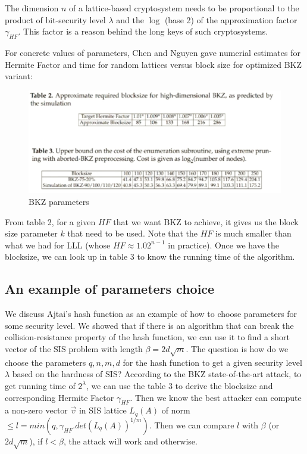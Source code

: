\begin{remark}
  The dimension $n$ of a lattice-based cryptosystem needs to be proportional to
  the product of bit-security level $\lambda$ and the $\log$ (base 2) of the
  approximation factor $\gamma_{HF}$.  This factor is a reason behind the long
  keys of such cryptosystems.
  \label{rem:dimension}
\end{remark}

For concrete values of parameters, Chen and Nguyen \cite{chen2011bkz} gave
numerial estimates for Hermite Factor and time for random lattices versus block
size for optimized BKZ variant:

\begin{figure}[h]
  \centering \includegraphics[scale=0.3]{bkzparams}
  \caption{BKZ parameters}
  \label{fig:BKZParams}
\end{figure}

From table 2, for a given $HF$ that we want BKZ to achieve, it gives us the
block size parameter $k$ that need to be used. Note that the $HF$ is much
smaller than what we had for LLL (whose $HF \approx 1.02^{n-1}$ in
practice). Once we have the blocksize, we can look up in table 3 to know the
running time of the algorithm.

\subsection{An example of parameters choice}
\label{sec:parameterChoice}
We discuss Ajtai's hash function as an example of how to choose parameters for
some security level. We showed that if there is an algorithm that can break the
collision-resistance property of the hash function, we can use it to find a
short vector of the SIS problem with length $\beta = 2d\sqrt{m}$. The question
is how do we choose the parameters $q,n,m,d$ for the hash function to get a
given security level $\lambda$ based on the hardness of SIS? According to the
BKZ state-of-the-art attack, to get running time of $2^\lambda$, we can use the
table 3 to derive the blocksize and corresponding Hermite Factor $\gamma_{HF}$.
Then we know the best attacker can compute a non-zero vector $\vec{v}$ in SIS
lattice $L_q(A)$ of norm $\leq l = min(q, \gamma_{HF}.det(L_q(A))^{1/m})$. Then
we can compare $l$ with $\beta$ (or $2d\sqrt{m}$), if $l < \beta$, the attack
will work and otherwise.

